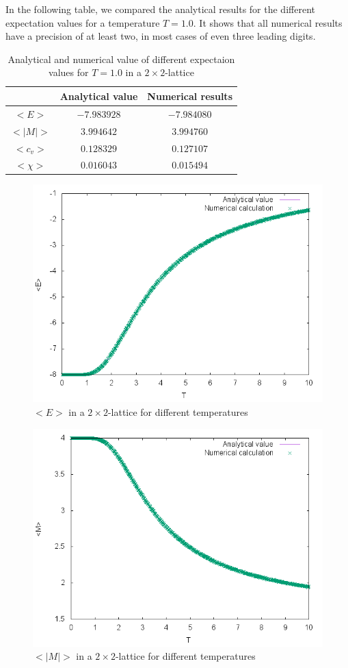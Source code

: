 \documentclass[10pt,a4paper]{article}
\begin{document}
In the following table, we compared the analytical results for the different expectation values for a temperature $T=1.0$. It shows that all numerical results have a precision of at least two, in most cases of even three leading digits.
\begin{table}[h]
	\centering
	\caption{Analytical and numerical value of different expectaion values for $T=1.0$ in a $2\times2$-lattice}
	\begin{tabular}{ccc}
	& Analytical value & Numerical results \\\hline
	$<E>$ & $-7.983928$ & $-7.984080$ \\
	$<|M|>$ & $3.994642$ & $3.994760$ \\
	$<c_v>$ & $0.128329$ & $0.127107$ \\
	$<\chi>$ & $0.016043$ & $0.015494$	
	\end{tabular}	
\end{table}
\begin{figure}[h]
	\includegraphics[width=\textwidth]{Energy.png}
	\caption{$<E>$ in a $2\times 2$-lattice for different temperatures\label{b_E}}
\end{figure}
\begin{figure}[h]
	\includegraphics[width=\textwidth]{Magnetization.png}
	\caption{$<|M|>$ in a $2\times 2$-lattice for different temperatures\label{b_M}}
\end{figure}
\end{document}
